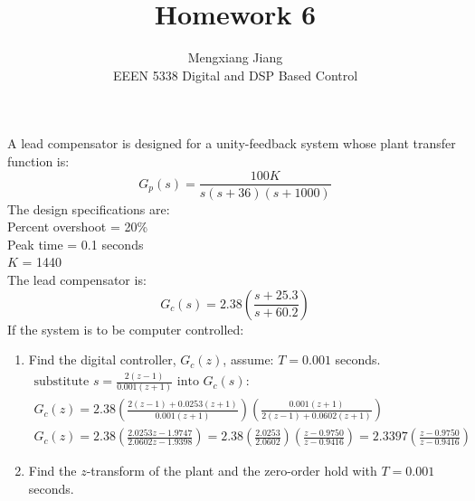 \documentclass[12pt]{article}
\newenvironment{problem}[2][Problem]{\begin{trivlist}
\item[\hskip \labelsep {\bfseries #1}\hskip \labelsep {\bfseries #2.}]}{\end{trivlist}}
\begin{document}
 
 
\title{Homework 6}%
\author{Mengxiang Jiang\\ %
EEEN 5338 Digital and DSP Based Control} %
 
\maketitle
 
\begin{problem}{1} %
    A lead compensator is designed for a unity-feedback system whose plant transfer function is:
    $$ G_p(s) = \frac{100K}{s(s+36)(s+1000)}$$
    The design specifications are:\\
    Percent overshoot = 20\%\\
    Peak time = 0.1 seconds\\
    $K$ = 1440\\
    The lead compensator is:
    $$ G_c(s) = 2.38\left(\frac{s+25.3}{s+60.2}\right)$$
    If the system is to be computer controlled:\\
    \begin{enumerate}
        \item Find the digital controller, $G_c(z)$, assume: $T = 0.001$ seconds. 
        \begin{align*}
            \text{substitute } s = \frac{2(z-1)}{0.001(z+1)} \text{ into } G_c(s):\\
            G_c(z) = 2.38\left(\frac{2(z-1)+0.0253(z+1)}{0.001(z+1)}\right)\left(\frac{0.001(z+1)}{2(z-1)+0.0602(z+1)}\right)\\
            G_c(z) = 2.38\left(\frac{2.0253z - 1.9747}{2.0602z - 1.9398}\right) = 2.38\left(\frac{2.0253}{2.0602}\right)\left(\frac{z - 0.9750}{z-0.9416}\right)=2.3397\left(\frac{z - 0.9750}{z-0.9416}\right)
        \end{align*}
        \pagebreak
        \item Find the $z$-transform of the plant and the zero-order hold with $T=0.001$ seconds.
        \begin{figure}[H]
            \centering

\end{figure}
\end{enumerate}
\end{problem}
\end{document}
